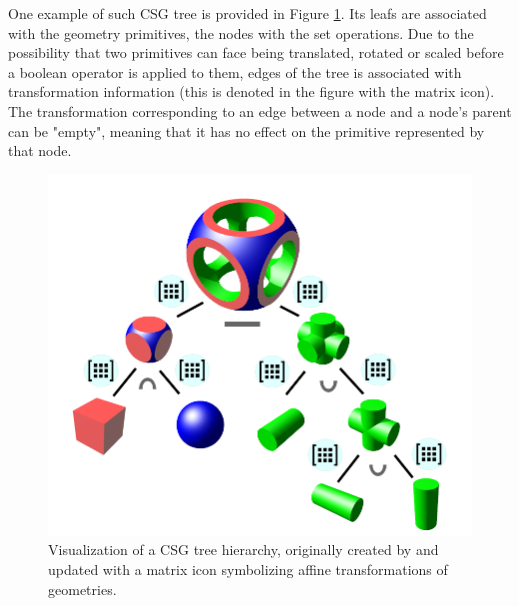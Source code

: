 One example of such CSG tree is provided in Figure \ref{fig:csg_tree}. Its leafs are associated with the geometry primitives, the nodes with the set operations. Due to the possibility that two primitives can face being translated, rotated or scaled before a boolean operator is applied to them, edges of the tree is associated with transformation information (this is denoted in the figure with the matrix icon). The transformation corresponding to an edge between a node and a node's parent can be "empty", meaning that it has no effect on the primitive represented by that node.  

\begin{figure}
	\centering
	\includegraphics[width=.9\linewidth]{img/1 fundamentals/csg_tree.png}
	\caption{Visualization of a CSG tree hierarchy, originally created by \cite{csgtree} and updated
	with a matrix icon symbolizing affine transformations of geometries.}
	\label{fig:csg_tree}
\end{figure}

